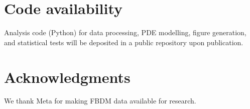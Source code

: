\documentclass[11pt]{article}
\begin{document}
\section*{Code availability}
Analysis code (Python) for data processing, PDE modelling, figure
generation, and statistical tests will be deposited in a public
repository upon publication.

\section*{Acknowledgments}
We thank Meta for making FBDM data available for
research.

\small


\end{document}
